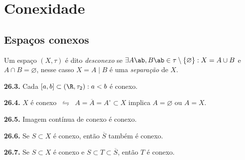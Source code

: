 \section{Conexidade}
 
\subsection*{Espaços conexos}

\begin{definition}
    Um espaço \((X,\tau)\) é dito \emph{desconexo} se \(\exists A\ab, B\ab \in \tau \setminus \{\varnothing\} : X = A \cup B\) e \(A \cap B = \varnothing\), nesse casso \(X = A \mid B\) é uma \emph{separação} de \(X\). 
\end{definition}

\begin{proposition}
    \textbf{26.3.} Cada \([a,b] \subset (\R, \tau_2) : a < b\) é conexo. 
\end{proposition}

\begin{proposition}
    \textbf{26.4.} \(X\) é conexo \(\ \leftrightharpoons \ \) \(A = \overline{A} = A^\circ \subset X \) implica \(A = \varnothing\) ou \(A = X\). 
\end{proposition}

\begin{proposition}
    \textbf{26.5.} Imagem contínua de conexo é conexo. 
\end{proposition}

\hypertarget{prop266}{}
\begin{proposition}
    \textbf{26.6.} Se \(S \subset X\)  é conexo, então \(\overline{S}\) também é conexo. 
\end{proposition}

\hypertarget{coro267}{}
\begin{corollary}
    \textbf{26.7.} Se \(S \subset X\) é conexo e \(S \subset T \subset \overline{S}\), então \(T\) é conexo. 
\end{corollary}


